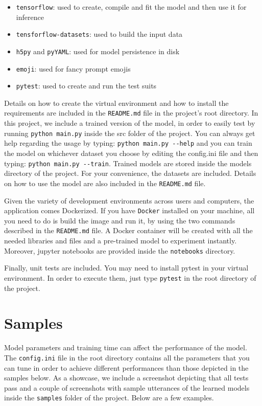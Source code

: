 \documentclass[10pt, twocolumn, a4paper]{article}
\begin{document}
\begin{itemize}
    \item \verb+tensorflow+: used to create, compile and fit the model and then use it for inference
    \item \verb+tensforflow-datasets+: used to build the input data
    \item \verb+h5py+ and \verb+pyYAML+: used for model persistence in disk
    \item \verb+emoji+: used for fancy prompt emojis
    \item \verb+pytest+: used to create and run the test suits
\end{itemize}

Details on how to create the virtual environment and how to install the requirements are included in the \verb+README.md+ file in the project’s root directory. In this project, we include a trained version of the model, in order to easily test by running \verb+python main.py+ inside the src folder of the project. You can always get help regarding the usage by typing: \verb+python main.py --help+ and you can train the model on whichever dataset you choose by editing the config.ini file and then typing: \verb+python main.py --train+. Trained models are stored inside the models directory of the project. For your convenience, the datasets are included. Details on how to use the model are also included in the \verb+README.md+ file.

Given the variety of development environments across users and computers, the application comes Dockerized. If you have \verb+Docker+ installed on your machine, all you need to do is build the image and run it, by using the two commands described in the \verb+README.md+ file. A Docker container will be created with all the needed libraries and files and a pre-trained model to experiment instantly. Moreover, jupyter notebooks are provided inside the \verb+notebooks+ directory.

Finally, unit tests are included. You may need to install pytest in your virtual environment. In order to execute them, just type \verb+pytest+ in the root directory of the project.

\section{Samples}
Model parameters and training time can affect the performance of the model. The \verb+config.ini+ file in the root directory contains all the parameters that you can tune in order to achieve different performances than those depicted in the samples below. As a showcase, we include a screenshot depicting that all tests pass and a couple of screenshots with sample utterances of the learned models inside the \verb+samples+ folder of the project. Below are a few examples.
\end{document}
